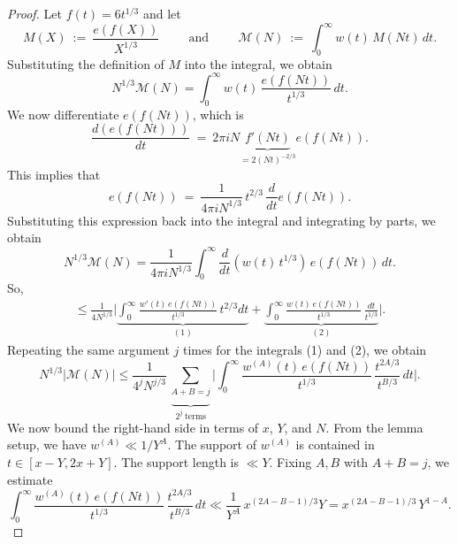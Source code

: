 \documentclass[oneside,reqno,10pt]{amsart}
\numberwithin{equation}{section}
\theoremstyle{plain}
\theoremstyle{definition}
\numberwithin{equation}{section}
\begin{document}
\begin{proof}
Let $f(t) = 6t^{1/3}$ and let
\begin{equation*}
    M(X)\ :=\ \frac{e(f(X))}{X^{1/3}} \hspace{1cm} \text{and} \hspace{1cm} \mathcal{M}(N)\ :=\ \int_{0}^{\infty} w(t)\, M(Nt)\, dt.
\end{equation*}
Substituting the definition of $M$ into the integral, we obtain
\begin{equation*}
    N^{1/3} \mathcal{M}(N) = \int_{0}^{\infty} w(t)\, \frac{e(f(Nt))}{t^{1/3}}\, dt.
\end{equation*}
We now differentiate $e(f(Nt))$, which is
\begin{equation*}
     \frac{d(e(f(Nt)))}{dt}\ =\ 2\pi iN \underbrace{f'(Nt)}_{=2(Nt)^{-2/3}} e(f(Nt)).
\end{equation*}
This implies that
\begin{equation*}
    e(f(Nt))\ =\ \frac{1}{4\pi i N^{1/3}}\, t^{2/3}\, \frac{d}{dt}e(f(Nt)).
\end{equation*}
Substituting this expression back into the integral and integrating by parts, we obtain
\begin{equation*}
    N^{1/3} \mathcal{M}(N) = \frac{1}{4\pi i N^{1/3}} \int_{0}^{\infty} \frac{d}{dt}(w(t)\, t^{1/3})\, e(f(Nt))\, dt.
\end{equation*}
So,
\begin{align*}
    \leq \frac{1}{4N^{1/3}} \Big| \underbrace{\int_{0}^{\infty} \frac{w'(t)\, e(f(Nt))}{t^{1/3}}\, t^{2/3} dt}_{(1)} + \underbrace{\int_{0}^{\infty} \frac{w(t)\, e(f(Nt))}{t^{1/3}}\, \frac{dt}{t^{1/3}}}_{(2)} \Big|.
\end{align*}
Repeating the same argument $j$ times for the integrals (1) and (2), we obtain
\begin{equation}\label{boundlemma5}
    N^{1/3} |\mathcal{M}(N)| \leq \frac{1}{4^j N^{j/3}}\, \underset{2^j\ \text{terms}}{\underbrace{\sum_{A+B=j}}} \Big| \int_{0}^{\infty} \frac{w^{(A)}(t)\, e(f(Nt))}{t^{1/3}}\, \frac{t^{2A/3}}{t^{B/3}}\, dt \Big|.
\end{equation}
We now bound the right-hand side in terms of $x$, $Y$, and $N$. From the lemma setup, we have $w^{(A)} \ll 1/Y^A$. The support of $w^{(A)}$ is contained in $t \in [x - Y, 2x + Y]$. The support length is $\ll Y$. Fixing $A, B$ with $A + B = j$, we estimate
\begin{equation*}
    \int_{0}^{\infty} \frac{w^{(A)}(t)\, e(f(Nt))}{t^{1/3}}\, \frac{t^{2A/3}}{t^{B/3}}\, dt \ll \frac{1}{Y^A}\, x^{(2A - B - 1)/3} Y = x^{(2A - B - 1)/3}\, Y^{1 - A}.

\end{equation*}
\end{proof}
\end{document}

